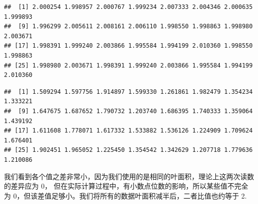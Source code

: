 \documentclass[
]{krantz}
\makeatletter
\newenvironment{Shaded}{\begin{snugshade}}{\end{snugshade}}
\newcommand{\CommentTok}[1]{\textcolor[rgb]{0.56,0.35,0.01}{\textit{#1}}}
\newcommand{\DataTypeTok}[1]{\textcolor[rgb]{0.13,0.29,0.53}{#1}}
\newcommand{\DecValTok}[1]{\textcolor[rgb]{0.00,0.00,0.81}{#1}}
\newcommand{\FloatTok}[1]{\textcolor[rgb]{0.00,0.00,0.81}{#1}}
\newcommand{\KeywordTok}[1]{\textcolor[rgb]{0.13,0.29,0.53}{\textbf{#1}}}
\newcommand{\NormalTok}[1]{#1}
\newcommand{\OperatorTok}[1]{\textcolor[rgb]{0.81,0.36,0.00}{\textbf{#1}}}
\newcommand{\StringTok}[1]{\textcolor[rgb]{0.31,0.60,0.02}{#1}}
\newenvironment{kframe}{%
\medskip{}
\setlength{\fboxsep}{.8em}
 \def\at@end@of@kframe{}%
 \ifinner\ifhmode%
  \def\at@end@of@kframe{\end{minipage}}%
  \begin{minipage}{\columnwidth}%
 \fi\fi%
 \def\FrameCommand##1{\hskip\@totalleftmargin \hskip-\fboxsep
 \colorbox{shadecolor}{##1}\hskip-\fboxsep
     \hskip-\linewidth \hskip-\@totalleftmargin \hskip\columnwidth}%
 \MakeFramed {\advance\hsize-\width
   \@totalleftmargin\z@ \linewidth\hsize
   \@setminipage}}%
 {\par\unskip\endMakeFramed%
 \at@end@of@kframe}
\renewenvironment{Shaded}{\begin{kframe}}{\end{kframe}}
\makeatother
\begin{document}
\begin{Shaded}
\end{Shaded}

\begin{verbatim}
##  [1] 2.000254 1.998957 2.000767 1.999234 2.007333 2.004346 2.000635 1.999893
##  [9] 1.996299 2.005611 2.008161 2.006110 1.998550 1.998863 1.998980 2.003671
## [17] 1.998391 1.999240 2.003866 1.995584 1.994199 2.010360 1.998550 1.998863
## [25] 1.998980 2.003671 1.998391 1.999240 2.003866 1.995584 1.994199 2.010360
\end{verbatim}

\begin{Shaded}
\end{Shaded}

\begin{verbatim}
##  [1] 1.509294 1.597756 1.914897 1.599330 1.261861 1.982479 1.354234 1.333221
##  [9] 1.647675 1.687652 1.790732 1.203740 1.686395 1.740333 1.359064 1.439192
## [17] 1.611608 1.778071 1.617332 1.533882 1.536126 1.224909 1.709624 1.676401
## [25] 1.902451 1.965052 1.225450 1.354542 1.342629 1.207718 1.779636 1.210086
\end{verbatim}

我们看到各个值之差非常小，因为我们使用的是相同的叶面积，理论上这两次读数的差异应为 0， 但在实际计算过程中，有小数点位数的影响，所以某些值不完全为 0，但该差值足够小。我们将所有的数据叶面积减半后，二者比值也约等于 2.
\end{document}
